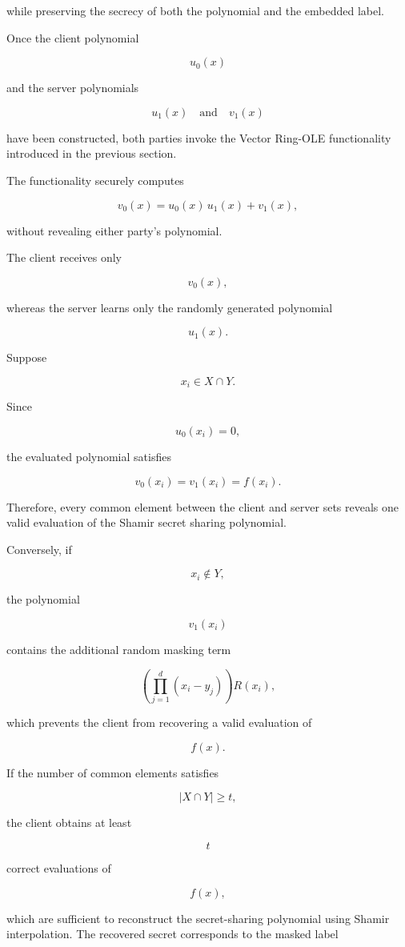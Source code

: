 \documentclass[11pt,a4paper]{article}
\begin{document}
while preserving the secrecy of both the polynomial and the embedded label.

Once the client polynomial

\[
u_0(x)
\]

and the server polynomials

\[
u_1(x)
\quad\text{and}\quad
v_1(x)
\]

have been constructed, both parties invoke the Vector Ring-OLE functionality introduced in the previous section.

The functionality securely computes

\[
v_0(x)
=
u_0(x)\,u_1(x)
+
v_1(x),
\]

without revealing either party's polynomial.

The client receives only

\[
v_0(x),
\]

whereas the server learns only the randomly generated polynomial

\[
u_1(x).
\]

Suppose

\[
x_i\in X\cap Y.
\]

Since

\[
u_0(x_i)=0,
\]

the evaluated polynomial satisfies

\[
v_0(x_i)
=
v_1(x_i)
=
f(x_i).
\]

Therefore, every common element between the client and server sets reveals one valid evaluation of the Shamir secret sharing polynomial.

Conversely, if

\[
x_i\notin Y,
\]

the polynomial

\[
v_1(x_i)
\]

contains the additional random masking term

\[
\left(
\prod_{j=1}^{d}(x_i-y_j)
\right)
R(x_i),
\]

which prevents the client from recovering a valid evaluation of

\[
f(x).
\]

If the number of common elements satisfies

\[
|X\cap Y|
\ge
t,
\]

the client obtains at least

\[
t
\]

correct evaluations of

\[
f(x),
\]

which are sufficient to reconstruct the secret-sharing polynomial using Shamir interpolation. The recovered secret corresponds to the masked label
\end{document}
